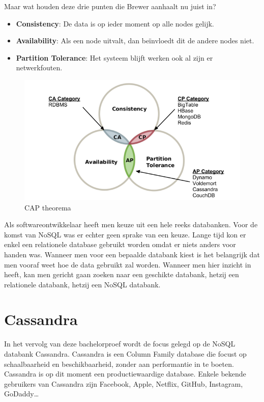 Maar wat houden deze drie punten die Brewer aanhaalt nu juist in?

\begin{itemize}
	\item \textbf{Consistency}: De data is op ieder moment op alle nodes gelijk.
	\item \textbf{Availability}: Als een node uitvalt, dan beïnvloedt dit de andere nodes niet.
	\item \textbf{Partition Tolerance}: Het systeem blijft werken ook al zijn er netwerkfouten.
\end{itemize}

\begin{figure}[H]
	\centering
	\includegraphics[width=1\textwidth]{img/2_inleiding/cap}
	\caption{CAP theorema \citep{Alvarado2014CAP}}
	\label{fig:cap}
\end{figure}

Als softwareontwikkelaar heeft men keuze uit een hele reeks databanken.
Voor de komst van NoSQL was er echter geen sprake van een keuze.
Lange tijd kon er enkel een relationele database gebruikt worden omdat er niets anders voor handen was.
Wanneer men voor een bepaalde databank kiest is het belangrijk dat men vooraf weet hoe de data gebruikt zal worden.
Wanneer men hier inzicht in heeft, kan men gericht gaan zoeken naar een geschikte databank, hetzij een relationele databank, hetzij een NoSQL databank.

\section{Cassandra}

In het vervolg van deze bachelorproef wordt de focus gelegd op de NoSQL databank Cassandra.
Cassandra is een Column Family database die focust op schaalbaarheid en beschikbaarheid, zonder aan performantie in te boeten.
Cassandra is op dit moment een productiewaardige database.
Enkele bekende gebruikers van Cassandra zijn Facebook, Apple, Netflix, GitHub, Instagram, GoDaddy\dots

